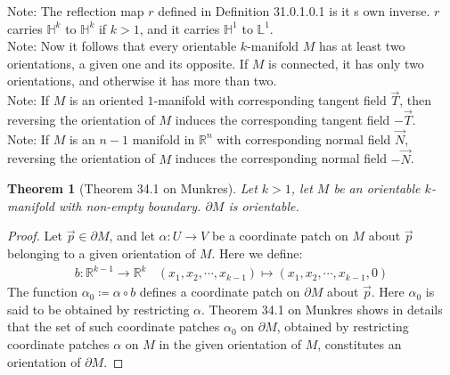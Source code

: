 \documentclass[11pt,oneside]{book}
\theoremstyle{break}
\theoremstyle{break}
\newtheorem{thm}{Theorem}[section]
\newcommand{\R}{\mathbb{R}}
\newcommand{\note}{\color{red}Note: \color{black}}
\begin{document}
\note The reflection map $r$ defined in Definition 31.0.1.0.1 is it s own inverse. $r$ carries $\mathbb{H}^k$ to $\mathbb{H}^k$ if $k>1$, and it carries $\mathbb{H}^1$ to $\mathbb{L}^1$. \\

\note Now it follows that every orientable $k$-manifold $M$ has at least two orientations, a given one and its opposite. If $M$ is connected, it has only two orientations, and otherwise it has more than two. \\

\note If $M$ is an oriented $1$-manifold with corresponding tangent field $\vec{T}$, then reversing the orientation of $M$ induces the corresponding tangent field $-\vec{T}$.\\

\note If $M$ is an $n-1$ manifold in $\R^n$ with corresponding normal field $\vec{N}$, reversing the orientation of $M$ induces the corresponding normal field $-\vec{N}$. \\

\begin{thm}[Theorem 34.1 on Munkres]
Let $k>1$, let $M$ be an orientable $k$-manifold with non-empty boundary. $\partial M$ is orientable. 
\end{thm}
\begin{proof}
Let $\vec{p} \in \partial M$, and let $\alpha:U \to V$ be a coordinate patch on $M$ about $\vec{p}$ belonging to a given orientation of $M$. Here we define:
\begin{align*}
b:\R^{k-1}\to \R^k \ \ \ \ (x_1,x_2,\cdots, x_{k-1}) \mapsto (x_1,x_2,\cdots, x_{k-1},0)
\end{align*}
The function $\alpha_0 \coloneqq \alpha\circ b$ defines a coordinate patch on $\partial M$ about $\vec{p}$. Here $\alpha_0$ is said to be obtained by restricting $\alpha$. Theorem 34.1 on Munkres shows in details that the set of such coordinate patches $\alpha_0$ on $\partial M$, obtained by restricting coordinate patches $\alpha$ on $M$ in the given orientation of $M$, constitutes an orientation of $\partial M$. 
\end{proof}
\end{document}
